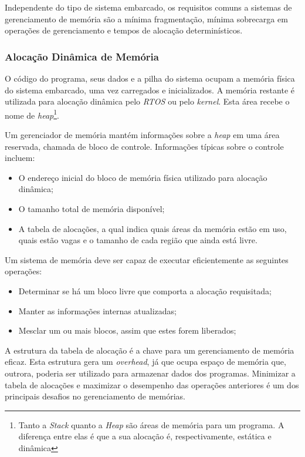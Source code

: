 Independente do tipo de sistema embarcado, os requisitos comuns a sistemas de gerenciamento de memória são a mínima fragmentação, mínima sobrecarga em operações de gerenciamento e tempos de alocação determinísticos.

\subsubsection{Alocação Dinâmica de Memória}

O código do programa, seus dados e a pilha do sistema ocupam a memória física do sistema embarcado, uma vez carregados e inicializados. A memória restante é utilizada para alocação dinâmica pelo \emph{RTOS} ou pelo \emph{kernel}. Esta área recebe o nome de \emph{heap}\footnote{Tanto a \emph{Stack} quanto a \emph{Heap} são áreas de memória para um programa. A diferença entre elas é que a sua alocação é, respectivamente, estática e dinâmica}.

Um gerenciador de memória mantém informações sobre a \emph{heap} em uma área reservada, chamada de bloco de controle. Informações típicas sobre o controle incluem:

\begin{itemize}
	\item O endereço inicial do bloco de memória física utilizado para alocação dinâmica;
	\item O tamanho total de memória disponível;
	\item A tabela de alocações, a qual indica quais áreas da memória estão em uso, quais estão vagas e o tamanho de cada região que ainda está livre.
\end{itemize}

Um sistema de memória deve ser capaz de executar eficientemente as seguintes operações:

\begin{itemize}
	\item Determinar se há um bloco livre que comporta a alocação requisitada;
	\item Manter as informações internas atualizadas;
	\item Mesclar um ou mais blocos, assim que estes forem liberados;
\end{itemize}

A estrutura da tabela de alocação é a chave para um gerenciamento de memória eficaz. Esta estrutura gera um \emph{overhead}, já que ocupa espaço de memória que, outrora, poderia ser utilizado para armazenar dados dos programas. Minimizar a tabela de alocações e maximizar o desempenho das operações anteriores é um dos principais desafios no gerenciamento de memórias.

